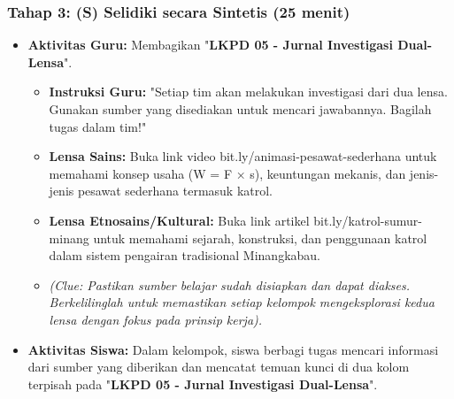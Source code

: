 \documentclass[a4paper,12pt]{article}
\begin{document}
\subsubsection{Tahap 3: (S) Selidiki secara Sintetis (25 menit)}
\begin{itemize}
\item \textbf{Aktivitas Guru:} Membagikan "\textbf{LKPD 05 - Jurnal Investigasi Dual-Lensa}".
    \begin{itemize}
    \item \textbf{Instruksi Guru:} "Setiap tim akan melakukan investigasi dari dua lensa. Gunakan sumber yang disediakan untuk mencari jawabannya. Bagilah tugas dalam tim!"
    \item \textbf{Lensa Sains:} Buka link video bit.ly/animasi-pesawat-sederhana untuk memahami konsep usaha (W = F × s), keuntungan mekanis, dan jenis-jenis pesawat sederhana termasuk katrol.
    \item \textbf{Lensa Etnosains/Kultural:} Buka link artikel bit.ly/katrol-sumur-minang untuk memahami sejarah, konstruksi, dan penggunaan katrol dalam sistem pengairan tradisional Minangkabau.
    \item \textit{(Clue: Pastikan sumber belajar sudah disiapkan dan dapat diakses. Berkelilinglah untuk memastikan setiap kelompok mengeksplorasi kedua lensa dengan fokus pada prinsip kerja).}
    \end{itemize}
\item \textbf{Aktivitas Siswa:} Dalam kelompok, siswa berbagi tugas mencari informasi dari sumber yang diberikan dan mencatat temuan kunci di dua kolom terpisah pada "\textbf{LKPD 05 - Jurnal Investigasi Dual-Lensa}".
\end{itemize}
\end{document}
